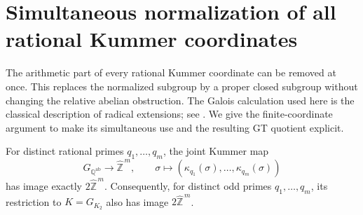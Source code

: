 \section{Simultaneous normalization of all rational Kummer coordinates}
\label{sec:rational-radical-normalization}

The arithmetic part of every rational Kummer coordinate can be removed
at once. This replaces the normalized subgroup by a proper closed
subgroup without changing the relative abelian obstruction.
The Galois calculation used here is the classical description of radical
extensions; see \cite[\S2, especially Theorem~2.5, author pp.~4--6]{MoreeStevenhagen}.
We give the finite-coordinate argument to make its simultaneous use and
the resulting GT quotient explicit.

\begin{lemma}\label{lem:simultaneous-kummer-image}
For distinct rational primes $q_1,\ldots,q_m$, the joint Kummer map
\[
 G_{\mathbb Q^{\mathrm{ab}}}\longrightarrow\widehat{\mathbb Z}^{\,m},
 \qquad \sigma\longmapsto
       (\kappa_{q_1}(\sigma),\ldots,\kappa_{q_m}(\sigma))
\]
has image exactly $2\widehat{\mathbb Z}^{\,m}$.
Consequently, for distinct odd primes $q_1,\ldots,q_m$, its restriction
to $K=G_{K_2}$ also has image $2\widehat{\mathbb Z}^{\,m}$.
\end{lemma}

